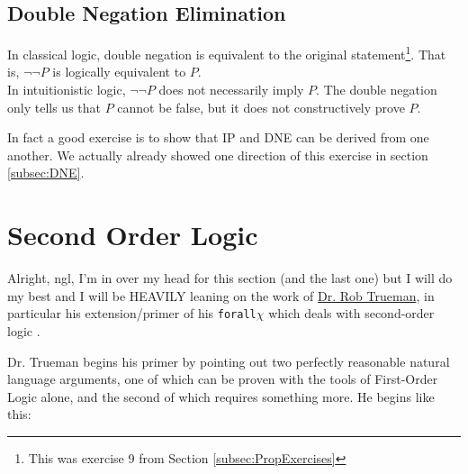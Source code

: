 \subsection{Double Negation Elimination}
In classical logic, double negation is equivalent to the original statement\footnote{This was exercise 9 from Section \ref{subsec:PropExercises}}. That is, $\neg \neg P$ is logically equivalent to $P$. \\

\noindent In intuitionistic logic, $\neg \neg P$ does not necessarily imply $P$. The double negation only tells us that 
$P$ cannot be false, but it does not constructively prove $P$.

In fact a good exercise is to show that IP and DNE can be derived from one another. We actually already showed one direction of this exercise in section \ref{subsec:DNE}.
\newpage 
\section{Second Order Logic}
Alright, ngl, I'm in over my head for this section (and the last one) but I will do my best and I will be HEAVILY leaning on the work of \href{https://www.rtrueman.com/}{Dr. Rob Trueman}, in particular his extension/primer of his \texttt{forall}$\chi$ which deals with second-order logic \cite{truemanSOL}.

Dr. Trueman begins his primer by pointing out two perfectly reasonable natural language arguments, one of which can be proven with the tools of First-Order Logic alone, and the second of which requires something more. He begins like this:

